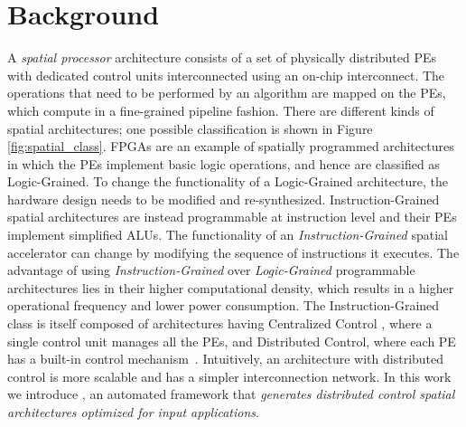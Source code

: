 \section{Background}
\label{sec:bg}

A \textit{spatial processor} architecture consists of a set of physically distributed PEs with dedicated control units interconnected using an on-chip interconnect. The operations that need to be performed by an algorithm are mapped on the PEs, which compute in a fine-grained pipeline fashion. There are different kinds of spatial architectures; one possible classification is shown in Figure \ref{fig:spatial_class}\cite{parashar2014efficient}. FPGAs are an example of spatially programmed architectures in which the PEs implement basic logic operations, and hence are classified as Logic-Grained. To change the functionality of a Logic-Grained architecture, the hardware design needs to be modified and re-synthesized. Instruction-Grained spatial architectures are instead programmable at instruction level and their PEs implement simplified ALUs. The functionality of an \textit{Instruction-Grained} spatial accelerator can change by modifying the sequence of instructions it executes. The advantage of using \textit{Instruction-Grained} over \textit{Logic-Grained} programmable architectures lies in their higher computational density, which results in a higher operational frequency and lower power consumption\cite{parashar2014efficient}. The Instruction-Grained class is itself composed of architectures having Centralized Control\cite{swanson2007wavescalar} , where a single control unit manages all the PEs, and Distributed Control, where each PE has a built-in control mechanism~\cite{parashar2014efficient,prabhakar2017plasticine,cerqueira2020catena}. Intuitively, an architecture with distributed control is more scalable and has a simpler interconnection network.
In this work we introduce \frameworkname, an automated framework that \textit{generates distributed control spatial architectures optimized for input applications}.




